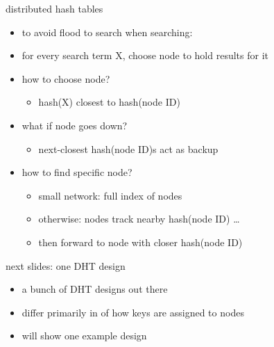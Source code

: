 \begin{frame}{distributed hash tables}
    \begin{itemize}
    \item to avoid flood to search when searching:
    \item for every search term X, choose node to hold results for it
    \item how to choose node?
        \begin{itemize}
        \item hash(X) closest to hash(node ID)
        \end{itemize}
    \item what if node goes down?
        \begin{itemize}
        \item next-closest hash(node ID)s act as backup
        \end{itemize}
    \item how to find specific node?
        \begin{itemize}
        \item small network: full index of nodes
        \item otherwise: nodes track nearby hash(node ID) \ldots
        \item then forward to node with closer hash(node ID)
        \end{itemize}
    \end{itemize}
\end{frame}

\begin{frame}{next slides: one DHT design}
    \begin{itemize}
    \item a bunch of DHT designs out there
    \vspace{.5cm}
    \item differ primarily in of how keys are assigned to nodes
    \item will show one example design
    \end{itemize}
\end{frame}
